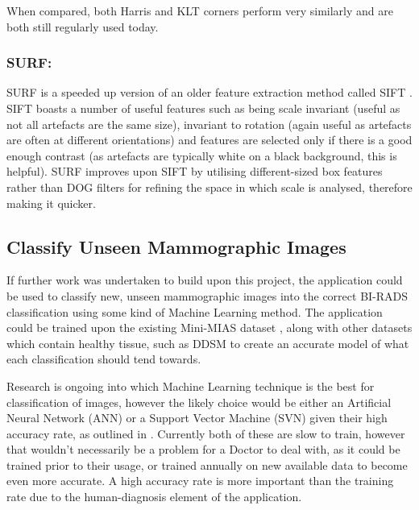 When compared, both Harris and KLT corners perform very similarly and are both still regularly used today.

\subsubsection{SURF: } \acrfull{SURF} \cite{Bay_Tuytelaars_Gool_2006} is a speeded up version of an older feature extraction method called \acrfull{SIFT} \cite{Lowe_1999}. \acrshort{SIFT} boasts a number of useful features such as being scale invariant (useful as not all artefacts are the same size), invariant to rotation (again useful as artefacts are often at different orientations) and features are selected only if there is a good enough contrast (as artefacts are typically white on a black background, this is helpful). \acrshort{SURF} improves upon \acrshort{SIFT} by utilising different-sized box features rather than \acrfull{DOG} filters for refining the space in which scale is analysed, therefore making it quicker.

\subsection{Classify Unseen Mammographic Images}

If further work was undertaken to build upon this project, the application could be used to classify new, unseen \gls{mammographic images} into the correct BI-RADS classification using some kind of Machine Learning method. The application could be trained upon the existing Mini-MIAS dataset \cite{Suckling_1994}, along with other datasets which contain healthy tissue, such as \acrshort{DDSM} \cite{Heath_Bowyer_Kopans_Moore_Kegelmeyer_Processing} \cite{Heath_Bowyer_Kopans_Kegelmeyer_Moore_Chang_MunishKumaran_1998} to create an accurate model of what each classification should tend towards.

Research is ongoing into which Machine Learning technique is the best for classification of images, however the likely choice would be either an Artificial Neural Network (ANN) or a Support Vector Machine (SVN) given their high accuracy rate, as outlined in \cite{kotsiantis2007supervised}. Currently both of these are slow to train, however that wouldn't necessarily be a problem for a Doctor to deal with, as it could be trained prior to their usage, or trained annually on new available data to become even more accurate. A high accuracy rate is more important than the training rate due to the human-diagnosis element of the application.

